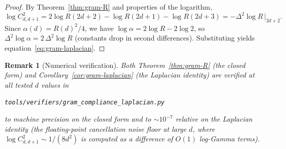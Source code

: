 \documentclass[11pt,a4paper]{article}
\newtheorem{remark}[theorem]{Remark}
\begin{document}
\begin{proof}
By Theorem~\ref{thm:gram-R} and properties of the logarithm,
\[
\log C^2_{d,d+1} = 2\log R(2d+2) - \log R(2d+1) - \log R(2d+3) = -\Delta^2 \log R\,\big|_{2d+2}.
\]
Since $\alpha(d) = R(d)^2/4$, we have $\log\alpha = 2\log R - 2\log 2$, so $\Delta^2 \log\alpha = 2\,\Delta^2 \log R$ (constants drop in second differences). Substituting yields equation~\eqref{eq:gram-laplacian}.
\end{proof}

\begin{remark}[Numerical verification]\label{rem:gram-verifier}
Both Theorem~\ref{thm:gram-R} (the closed form) and Corollary~\ref{cor:gram-laplacian} (the Laplacian identity) are verified at all tested $d$ values in
\begin{center}
\texttt{tools/verifiers/gram\_compliance\_laplacian.py}
\end{center}
to machine precision on the closed form and to $\sim 10^{-7}$ relative on the Laplacian identity (the floating-point cancellation noise floor at large $d$, where $\log C^2_{d,d+1} \sim 1/(8d^2)$ is computed as a difference of $O(1)$ log-Gamma terms).
\end{remark}
\end{document}
